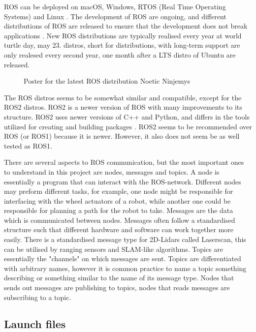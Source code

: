 ROS can be deployed on macOS, Windows, RTOS (Real Time Operating Systems) and Linux \cite{WhyROS}. The development of ROS are ongoing, and different distributions of ROS are released to ensure that the development does not break applications \cite{REP2000}. New ROS distributions are typically realised every year at world turtle day, may 23. distros, short for distributions, with long-term support are only realesed every second year, one month after a LTS distro of Ubuntu are released. 

\begin{figure}[H]
\centering

  \caption{Poster for the latest ROS distribution Noetic Ninjemys \cite{ROSLogo}}
  \label{fig:noeticLogo}
\end{figure}

The ROS distros seems to be somewhat similar and compatible, except for the ROS2 distros. ROS2 is a newer version of ROS with many improvements to its structure. ROS2 uses newer versions of C++ and Python, and differs in the tools utilized for creating and building packages \cite{ROSChanges}. ROS2 seems to be recommended over ROS (or ROS1) because it is newer. However, it also does not seem be as well tested as ROS1.

There are several aspects to ROS communication, but the most important ones to understand in this project are nodes, messages and topics. A node is essentially a program that can interact with the ROS-network. Different nodes may preform different tasks, for example, one node might be responsible for interfacing with the wheel actuators of a robot, while another one could be responsible for planning a path for the robot to take. Messages are the data which is communicated between nodes. Messages often follow a standardised structure such that different hardware and software can work together more easily. There is a standardised message type for 2D-Lidars called Laserscan, this can be utilised by ranging sensors and SLAM-like algorithms.  Topics are essentially the "channels" on which messages are sent. Topics are differentiated with arbitrary names, however it is common practice to name a topic something describing or something similar to the name of its message type. Nodes that sends out messages are publishing to topics, nodes that reads messages are subscribing to a topic. 

\subsection{Launch files}

